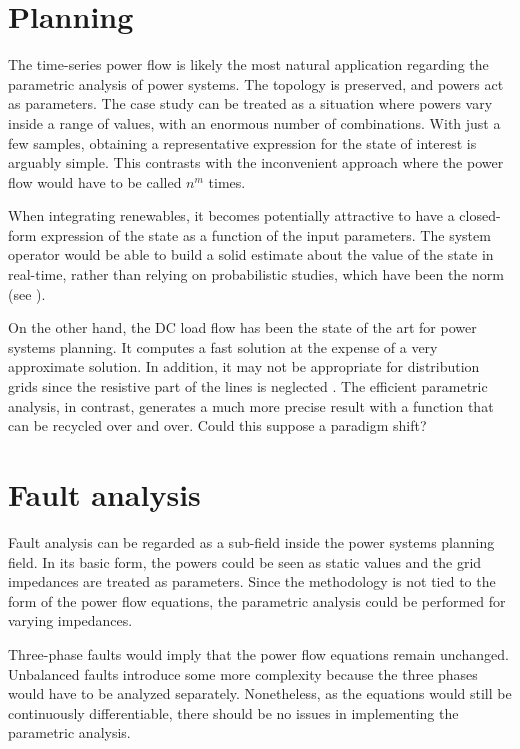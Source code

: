 
\section{Planning}
The time-series power flow is likely the most natural application regarding the parametric analysis of power systems. The topology is preserved, and powers act as parameters. The case study can be treated as a situation where powers vary inside a range of values, with an enormous number of combinations. With just a few samples, obtaining a representative expression for the state of interest is arguably simple. This contrasts with the inconvenient approach where the power flow would have to be called $n^m$ times. 

When integrating renewables, it becomes potentially attractive to have a closed-form expression of the state as a function of the input parameters. The system operator would be able to build a solid estimate about the value of the state in real-time, rather than relying on probabilistic studies, which have been the norm (see \cite{morales2010, fan2012, boehme2007}). 

On the other hand, the DC load flow has been the state of the art for power systems planning. It computes a fast solution at the expense of a very approximate solution. In addition, it may not be appropriate for distribution grids since the resistive part of the lines is neglected \cite{seifi2011}. The efficient parametric analysis, in contrast, generates a much more precise result with a function that can be recycled over and over. Could this suppose a paradigm shift?

\section{Fault analysis}
Fault analysis can be regarded as a sub-field inside the power systems planning field. In its basic form, the powers could be seen as static values and the grid impedances are treated as parameters. Since the methodology is not tied to the form of the power flow equations, the parametric analysis could be performed for varying impedances. 

Three-phase faults would imply that the power flow equations remain unchanged. Unbalanced faults introduce some more complexity because the three phases would have to be analyzed separately. Nonetheless, as the equations would still be continuously differentiable, there should be no issues in implementing the parametric analysis. 

